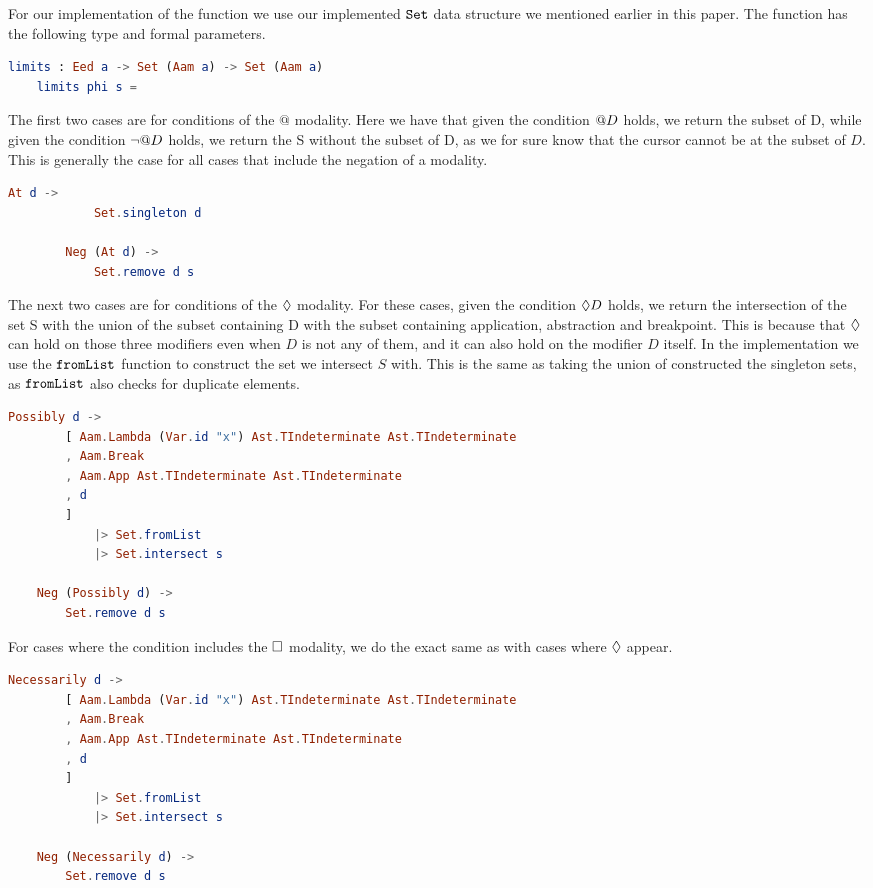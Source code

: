 For our implementation of the function we use our implemented $\texttt{Set}$ data
structure we mentioned earlier in this paper. The function has the following
type and formal parameters.
\begin{lstlisting}[language=elm,%
    gobble=4,%
    ]
    limits : Eed a -> Set (Aam a) -> Set (Aam a)
    limits phi s =
\end{lstlisting}
The first two cases are for conditions of the $@$ modality. Here we have that
given the condition $@D$ holds, we return the subset of D, while given the
condition $\neg\at{D}$ holds, we return the S without the subset of D, as we
for sure know that the cursor cannot be at the subset of $D$. This is generally
the case for all cases that include the negation of a modality.
\begin{lstlisting}[language=elm,%
    gobble=8,%
    ]
        At d ->
            Set.singleton d

        Neg (At d) ->
            Set.remove d s
\end{lstlisting}
The next two cases are for conditions of the $\possibly$ modality. For these
cases, given the condition $\Diamond D$ holds, we return the intersection of
the set S with the union of the subset containing D with the subset containing
application, abstraction and breakpoint. This is because that $\possibly$ can
hold on those three modifiers even when $D$ is not any of them, and it can also
hold on the modifier $D$ itself. In the implementation we use the
$\texttt{fromList}$ function to construct the set we intersect $S$ with. This is
the same as taking the union of constructed the singleton sets, as
$\texttt{fromList}$ also checks for duplicate elements.
\begin{lstlisting}[language=elm,%
    gobble=4,%
    ]
    Possibly d ->
        [ Aam.Lambda (Var.id "x") Ast.TIndeterminate Ast.TIndeterminate
        , Aam.Break
        , Aam.App Ast.TIndeterminate Ast.TIndeterminate
        , d
        ]
            |> Set.fromList
            |> Set.intersect s

    Neg (Possibly d) ->
        Set.remove d s
\end{lstlisting}
For cases where the condition includes the $\necessarily$ modality, we do the
exact same as with cases where $\possibly$ appear.
\begin{lstlisting}[language=elm,%
    gobble=4,%
    ]
    Necessarily d ->
        [ Aam.Lambda (Var.id "x") Ast.TIndeterminate Ast.TIndeterminate
        , Aam.Break
        , Aam.App Ast.TIndeterminate Ast.TIndeterminate
        , d
        ]
            |> Set.fromList
            |> Set.intersect s

    Neg (Necessarily d) ->
        Set.remove d s
\end{lstlisting}

